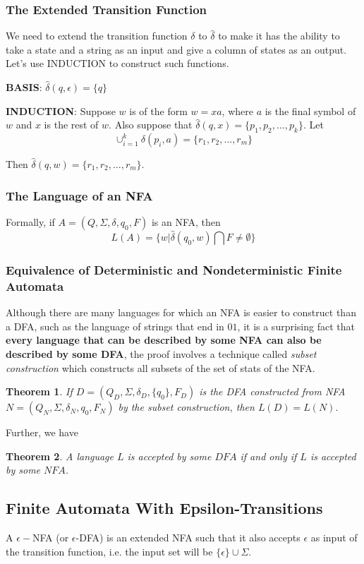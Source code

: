 \documentclass[12pt,reqno]{amsart}
\newtheorem{thm}{Theorem}[section]
\begin{document}
\subsubsection{The Extended Transition Function}
We need to extend the transition function $\delta$ to $\hat{\delta}$ to make it has the ability to take a state and a string as an input and give a column of states as an output. Let's use INDUCTION to construct such functions.

\textbf{BASIS}: $\hat{\delta}(q,\epsilon) = \{q\}$

\textbf{INDUCTION}: Suppose $w$ is of the form $w=xa$, where $a$ is the final symbol of $w$ and $x$ is the rest of $w$. Also suppose that $\hat{\delta}(q,x) = \{p_1,p_2, \ldots, p_k \}.$ Let
$$
	\cup_{i=1}^k\delta(p_i,a) = \{r_1, r_2, \ldots, r_m \}
$$  

Then $\hat{\delta}(q,w) = \{r_1, r_2, \ldots, r_m \}$.

\subsubsection{The Language of an NFA}
Formally, if $A = (Q, \Sigma, \delta, q_0, F)$ is an NFA, then
$$
	L(A) = \{w | \hat{\delta}(q_0,w) \bigcap F \neq \emptyset \}
$$

\subsubsection{Equivalence of Deterministic and Nondeterministic Finite Automata}
Although there are many languages for which an NFA is easier to construct than a DFA, such as the language of strings that end in $01$, it is a surprising fact that \textbf{every language that can be described by some NFA can also be described by some DFA}, the proof involves a technique called \textit{subset construction} which constructs all subsets of the set of stats of the NFA.

\begin{thm}
	If $D = (Q_D, \Sigma, \delta_D, \{ q_0\}, F_D)$ is the DFA constructed from NFA $N = (Q_N, \Sigma, \delta_N, q_0, F_N)$ by the subset construction, then $L(D) = L(N).$ 
\end{thm}
Further, we have
\begin{thm}
	A language $L$ is accepted by some $DFA$ if and only if $L$ is accepted by some $NFA$.
\end{thm}

\subsection{Finite Automata With Epsilon-Transitions}
A $\epsilon-$NFA (or $\epsilon$-DFA) is an extended NFA such that  it also accepts $\epsilon$ as input of the transition function, i.e. the input set will be $\{\epsilon\}\cup \Sigma$.
\end{document}

